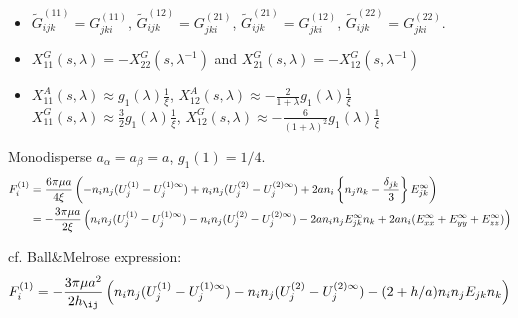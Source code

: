 \documentclass[12pt]{article}
\begin{document}
\begin{itemize}
 \item $\tilde{G}_{ijk}^{(11)}=G_{jki}^{(11)}$,
$\tilde{G}_{ijk}^{(12)}=G_{jki}^{(21)}$,
$\tilde{G}_{ijk}^{(21)}=G_{jki}^{(12)}$,
$\tilde{G}_{ijk}^{(22)}=G_{jki}^{(22)}$.

 \item 
$X_{11}^{G}(s,\lambda)
= - X_{22}^{G} (s, \lambda^{-1})$
and $X_{21}^{G}(s,\lambda)
= - X_{12}^{G} (s, \lambda^{-1})$

 \item 
$X_{11}^{A}(s,\lambda)\approx g_1(\lambda) \frac{1}{\xi}$, 
$X_{12}^{A}(s,\lambda) \approx -\frac{2}{1+\lambda}g_1(\lambda) \frac{1}{\xi}$\\
$X_{11}^{G}(s,\lambda)\approx \frac{3}{2} g_1(\lambda) \frac{1}{\xi}$,
$X_{12}^{G}(s,\lambda)\approx -\frac{6}{(1+\lambda)^2} g_1(\lambda) \frac{1}{\xi}$   
\end{itemize}
Monodisperse $a_\alpha = a_{\beta}=a$, $g_1(1)=1/4$.
\begin{align}
 F^{(1)}_i
&= 
\frac{6 \pi\mu a}{4\xi}
\left(
-   n_i n_j
(U_{j}^{(1)}-U_{j}^{(1)\infty})
+   n_i n_j
(U_{j}^{(2)}-U_{j}^{(2)\infty})
+  
2a n_i\left\{n_j n_k - \frac{\delta_{jk}}{3} \right\} E^{\infty}_{jk}
\right) \notag \\
&= 
-
\frac{3 \pi\mu a}{2\xi}
\left(
   n_i n_j
(U_{j}^{(1)}-U_{j}^{(1)\infty})
-   n_i n_j
(U_{j}^{(2)}-U_{j}^{(2)\infty})
-  
2a n_in_j  E^{\infty}_{jk}n_k
+2an_i(E^{\infty}_{xx}+E^{\infty}_{yy}+E^{\infty}_{zz} )
\right)
\end{align}

cf. Ball\&Melrose expression:
\begin{equation}
F_i^{(1)}
=
- 
\frac{3 \pi \mu a^2}{2 h_{\ij}}
\left(
n_{i} n_j (U^{(1)}_j-U^{(1)\infty}_j)
- n_{i} n_j (U^{(2)}_j-U^{(2)\infty}_j)
- (2+h/a) n_i n_j  E_{jk}n_k
\right) 
 \end{equation}





\newpage
\end{document}
